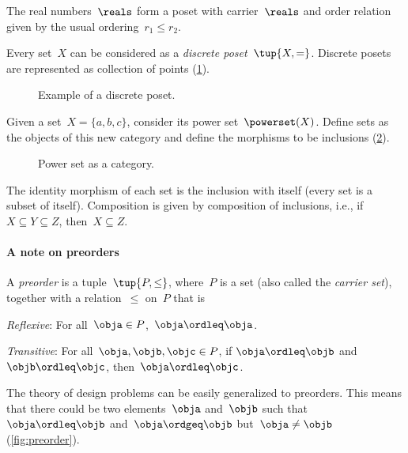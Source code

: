 \begin{example}[Reals]
  The real numbers~$\reals$ form a poset with carrier~$\reals$ and order relation given by the usual ordering~$r_1 \leq r_2$.
\end{example}

\begin{example}
  \label{ex:discreteposet}
  Every set~$X$ can be considered as a \emph{discrete poset}~$\tup{X,=}$. Discrete posets are represented as collection of points (\cref{fig:discretepos}).

  \begin{figure}[tbh]
    \centering
    \caption{Example of a discrete poset. \label{fig:discretepos}}
  \end{figure}

  \begin{example}
    \label{ex:hasseinclusion}
    Given a set~$X=\{a,b,c\}$, consider its power set~$\powerset(X)$. Define sets as the objects of this new category and define the morphisms to be inclusions (\cref{fig:powersetcat}).

    \begin{figure}[h!]
      \begin{center}
      \end{center}
      \caption{Power set as a category. \label{fig:powersetcat}}
    \end{figure}

    The identity morphism of each set is the inclusion with itself (every set is a subset of itself). Composition is given by composition of inclusions, i.e., if~$X\subseteq Y \subseteq Z$, then~$X\subseteq Z$.
  \end{example}
\end{example}

\paragraph{A note on preorders}
\begin{definition}[Preorder]
  \label{def:preorder}
  A \emph{preorder} is a tuple~$\tup{P, \leq}$,
  where~$P$ is a set (also called the \emph{carrier set}), together with a
  relation~$\leq$ on~$P$ that is
  \begin{compactenum}
    \item \emph{Reflexive}: For all~$\obja\in P$,~$\obja\ordleq \obja$.
    \item \emph{Transitive}: For all~$\obja,\objb,\objc\in P$, if $\obja\ordleq \objb$ and~$\objb\ordleq \objc$, then~$\obja\ordleq \objc$.
  \end{compactenum}
\end{definition}
The theory of design problems can be easily generalized to preorders. This means that there could be two elements~$\obja$ and~$\objb$ such that~$\obja\ordleq \objb$ and~$\obja \ordgeq \objb$ but~$\obja \neq \objb$ (\cref{fig:preorder}).

